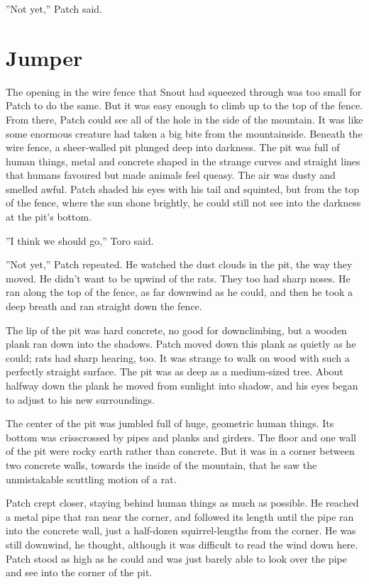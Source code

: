\documentclass[12pt]{book}
\begin{document}
''Not yet,'' Patch said.


\section{Jumper}

The opening in the wire fence that Snout had squeezed through was too small for Patch to do the same. But it was easy enough to climb up to the top of the fence. From there, Patch could see all of the hole in the side of the mountain. It was like some enormous creature had taken a big bite from the mountainside. Beneath the wire fence, a sheer-walled pit plunged deep into darkness. The pit was full of human things, metal and concrete shaped in the strange curves and straight lines that humans favoured but made animals feel queasy. The air was dusty and smelled awful. Patch shaded his eyes with his tail and squinted, but from the top of the fence, where the sun shone brightly, he could still not see into the darkness at the pit's bottom.

''I think we should go,'' Toro said.

''Not yet,'' Patch repeated. He watched the dust clouds in the pit, the way they moved. He didn't want to be upwind of the rats. They too had sharp noses. He ran along the top of the fence, as far downwind as he could, and then he took a deep breath and ran straight down the fence.

The lip of the pit was hard concrete, no good for downclimbing, but a wooden plank ran down into the shadows. Patch moved down this plank as quietly as he could; rats had sharp hearing, too. It was strange to walk on wood with such a perfectly straight surface. The pit was as deep as a medium-sized tree. About halfway down the plank he moved from sunlight into shadow, and his eyes began to adjust to his new surroundings.

The center of the pit was jumbled full of huge, geometric human things. Its bottom was crisscrossed by pipes and planks and girders. The floor and one wall of the pit were rocky earth rather than concrete. But it was in a corner between two concrete walls, towards the inside of the mountain, that he saw the unmistakable scuttling motion of a rat.

Patch crept closer, staying behind human things as much as possible. He reached a metal pipe that ran near the corner, and followed its length until the pipe ran into the concrete wall, just a half-dozen squirrel-lengths from the corner. He was still downwind, he thought, although it was difficult to read the wind down here. Patch stood as high as he could and was just barely able to look over the pipe and see into the corner of the pit.
\end{document}
